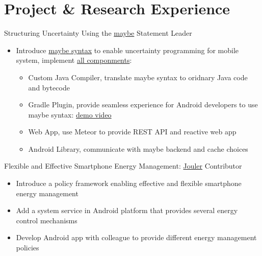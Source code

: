 \section{Project \& Research Experience}
{Structuring Uncertainty Using the \href{http://blue.cse.buffalo.edu/projects/maybe}{maybe} Statement}
{Leader}
{}
{}
{
  \begin{itemize}
  \item Introduce \href{https://blue-systems-research-group.gitbooks.io/maybe/content/concepts.html}{maybe syntax} to enable uncertainty programming for mobile system,
implement \href{https://blue-systems-research-group.gitbooks.io/maybe/content/}{all componments}:
    \begin{itemize}
      \item Custom Java Compiler, translate maybe syntax to oridnary Java code and bytecode
      \item Gradle Plugin, provide seamless experience for Android developers to use maybe syntax: \href{https://www.youtube.com/watch?v=RYcQ7WVunmc}{demo video}
      \item Web App, use Meteor to provide REST API and reactive web app
      \item Android Library, communicate with maybe backend and cache choices
    \end{itemize}
  \end{itemize}
}

{Flexible and Effective Smartphone Energy Management: \href{http://blue.cse.buffalo.edu/projects/jouler/}{Jouler}}
{Contributor}
{}
{}
{
  \begin{itemize}
    \item Introduce a policy framework enabling effective and flexible smartphone energy management
    \item Add a system service in Android platform that provides several energy control mechanisms
    \item Develop Android app with colleague to provide different energy management policies
  \end{itemize}
}

